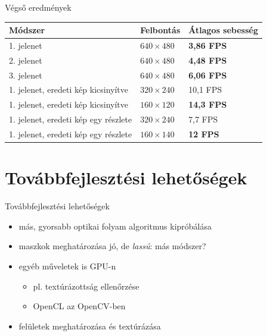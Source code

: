 \begin{frame}[c]{Végső eredmények}

\centering
\begin{tabular}{|l|l|l|}
\hline
\textbf{Módszer} & \textbf{Felbontás} & \textbf{Átlagos sebesség} \\ \hline\hline

1. jelenet  & $640\times 480$ & \textbf{3,86 FPS} \\ \hline\hline
2. jelenet & $640\times 480$ & \textbf{4,48 FPS} \\ \hline\hline
3. jelenet & $640\times 480$ & \textbf{6,06 FPS} \\ \hline\hline

1. jelenet, eredeti kép kicsinyítve & $320\times 240$ & 10,1 FPS \\ \hline
1. jelenet, eredeti kép kicsinyítve & $160\times 120$ & \textbf{14,3 FPS} \\ \hline\hline

1. jelenet, eredeti kép egy részlete & $320\times 240$ & 7,7 FPS \\ \hline
1. jelenet, eredeti kép egy részlete & $160\times 140$ & \textbf{12 FPS} \\ \hline

\end{tabular}

\end{frame}

\section[Továbbfejlesztés]{Továbbfejlesztési lehetőségek}
  
  
  \begin{frame}{Továbbfejlesztési lehetőségek}
    \begin{itemize}
      \item más, gyorsabb optikai folyam algoritmus kipróbálása
      \item maszkok meghatározása jó, de \textit{lassú}: más módszer?
      \item egyéb műveletek is GPU-n
      \begin{itemize}
      \item pl. textúrázottság ellenőrzése
      \item OpenCL az OpenCV-ben
      \end{itemize}
      \item felületek meghatározása és textúrázása
    \end{itemize}
  \end{frame}


